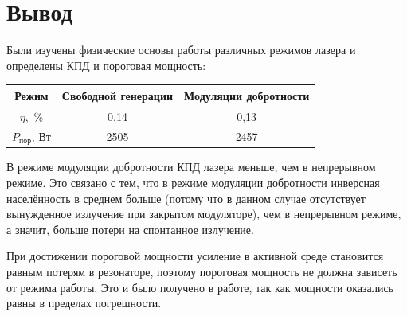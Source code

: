 \documentclass[a4paper, 12pt]{article}
\begin{document}
\section{Вывод}
Были изучены физические основы работы различных режимов лазера и определены КПД и пороговая мощность:
\begin{table}[h!]
		\centering
		\begin{tabular}{|c||c|c|}
			\hline
			Режим & Свободной генерации   & Модуляции добротности \\ 					\hline
			$\eta$,~\%   & 0,14 & 0,13 \\ \hline
			$P_{\text{пор}}$, Вт    & 2505 & 2457 \\
			\hline
		\end{tabular}
	\end{table}\par
	В режиме модуляции добротности КПД лазера меньше, чем в непрерывном режиме. Это связано с тем, что в режиме модуляции добротности инверсная населённость в среднем больше (потому что в данном случае отсутствует вынужденное излучение при закрытом модуляторе), чем в непрерывном режиме, а значит, больше потери на спонтанное излучение.\par
	При достижении пороговой мощности усиление в активной среде становится равным потерям в резонаторе, поэтому пороговая мощность не должна зависеть от режима работы. Это и было получено в работе, так как мощности оказались равны в пределах погрешности.
\end{document}
